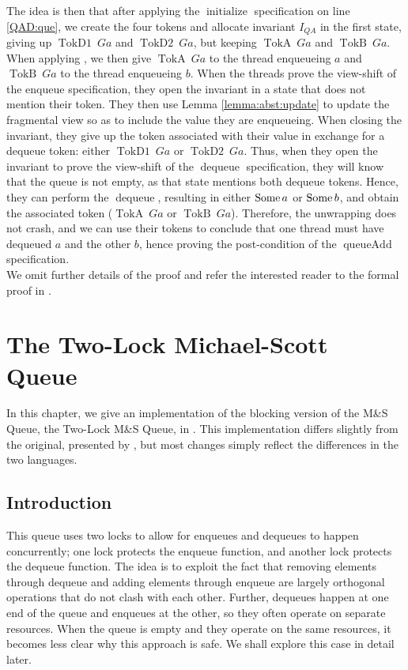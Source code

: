 \documentclass[a4paper, 10pt]{report}
\theoremstyle{definition}
\newcommand{\initialise}{\operatorname{initialize}}
\newcommand{\dequeue}{\operatorname{dequeue}}
\newcommand{\queueAdd}{\operatorname{queueAdd}}
\newcommand{\msq}{M\&S Queue}
\newcommand{\tlmsq}{Two-Lock \msq{}}
\newcommand{\QueueAddInvariant}{I_{QA}}
\newcommand{\QAg}{Ga}
\newcommand{\TokDo}[1]{\operatorname{TokD1} ~ #1}
\newcommand{\TokDoQAg}{\TokDo{\QAg}}
\newcommand{\TokDt}[1]{\operatorname{TokD2} ~ #1}
\newcommand{\TokDtQAg}{\TokDt{\QAg}}
\newcommand{\TokA}[1]{\operatorname{TokA} ~ #1}
\newcommand{\TokAQAg}{\TokA{\QAg}}
\newcommand{\TokB}[1]{\operatorname{TokB} ~ #1}
\newcommand{\TokBQAg}{\TokB{\QAg}}
\begin{document}
The idea is then that after applying the $\initialise$ specification on line \ref{QAD:que}, we create the four tokens and allocate invariant $\QueueAddInvariant$ in the first state, giving up $\TokDoQAg$ and $\TokDtQAg$, but keeping $\TokAQAg$ and $\TokBQAg$. When applying , we then give $\TokAQAg$ to the thread enqueueing $a$ and $\TokBQAg$ to the thread enqueueing $b$. When the threads prove the view-shift of the enqueue specification, they open the invariant in a state that does not mention their token. They then use Lemma \ref{lemma:abst:update} to update the fragmental view so as to include the value they are enqueueing. When closing the invariant, they give up the token associated with their value in exchange for a dequeue token: either $\TokDoQAg$ or $\TokDtQAg$. Thus, when they open the invariant to prove the view-shift of the $\dequeue$ specification, they will know that the queue is not empty, as that state mentions both dequeue tokens. Hence, they can perform the $\dequeue$, resulting in either $\operatorname{Some} a$ or $\operatorname{Some} b$, and obtain the associated token ($\TokAQAg$ or $\TokBQAg$). Therefore, the unwrapping does not crash, and we can use their tokens to conclude that one thread must have dequeued $a$ and the other $b$, hence proving the post-condition of the $\queueAdd$ specification.\\
We omit further details of the proof and refer the interested reader to the formal proof in .


\chapter{The Two-Lock Michael-Scott Queue}
\label{ch:TLMSQ}

In this chapter, we give an implementation of the blocking version of the \msq{}, the \tlmsq{}, in \heaplang. This implementation differs slightly from the original, presented by \citet{DBLP:conf/podc/MichaelS96}, but most changes simply reflect the differences in the two languages.

\section{Introduction}
\label{TLMSQ:section:introduction}

This queue uses two locks to allow for enqueues and dequeues to happen concurrently; one lock protects the enqueue function, and another lock protects the dequeue function. The idea is to exploit the fact that removing elements through dequeue and adding elements through enqueue are largely orthogonal operations that do not clash with each other. Further, dequeues happen at one end of the queue and enqueues at the other, so they often operate on separate resources. When the queue is empty and they operate on the same resources, it becomes less clear why this approach is safe. We shall explore this case in detail later.
\end{document}
